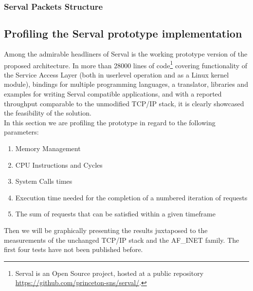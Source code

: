 \subsubsection{Serval Packets Structure}



\subsection{Profiling the Serval prototype implementation}
Among the admirable headliners of Serval is the working prototype version of the proposed architecture.
In more than 28000 lines of code\footnote{Serval is an Open Source project, hosted at a public repository\\ \url{https://github.com/princeton-sns/serval/}.} covering functionality of the Service Access Layer (both in userlevel operation and as a Linux kernel module), bindings for multiple programming languages, a translator, libraries and examples for writing Serval compatible applications, and with a reported throughput comparable to the unmodified TCP/IP stack, it is clearly showcased the feasibility of the solution.\\
\indent In this section we are profiling the prototype in regard to the following parameters:
\begin{enumerate}
  \item Memory Management
  \item CPU Instructions and Cycles
  \item System Calls times
  \item Execution time needed for the completion of a numbered iteration of requests
  \item The sum of requests that can be satisfied within a given timeframe
\end{enumerate}
Then we will be graphically presenting the results juxtaposed to the measurements of the unchanged TCP/IP stack and the AF\_INET family. The first four tests have not been published before.

